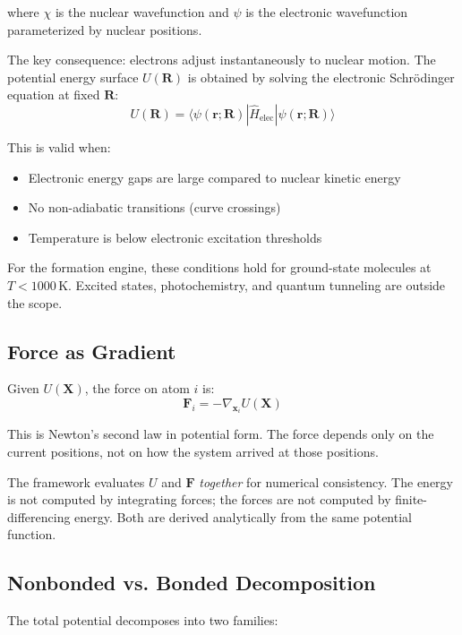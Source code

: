 \documentclass[11pt]{article}
\begin{document}
where $\chi$ is the nuclear wavefunction and $\psi$ is the electronic wavefunction parameterized by nuclear positions.

The key consequence: electrons adjust instantaneously to nuclear motion. The potential energy surface $U(\mathbf{R})$ is obtained by solving the electronic Schrödinger equation at fixed $\mathbf{R}$:
\begin{equation}
U(\mathbf{R}) = \langle \psi(\mathbf{r}; \mathbf{R}) | \hat{H}_{\text{elec}} | \psi(\mathbf{r}; \mathbf{R}) \rangle
\end{equation}

This is valid when:
\begin{itemize}
\item Electronic energy gaps are large compared to nuclear kinetic energy
\item No non-adiabatic transitions (curve crossings)
\item Temperature is below electronic excitation thresholds
\end{itemize}

For the formation engine, these conditions hold for ground-state molecules at $T < 1000$\,K. Excited states, photochemistry, and quantum tunneling are outside the scope.

\subsection{Force as Gradient}

Given $U(\mathbf{X})$, the force on atom $i$ is:
\begin{equation}
\mathbf{F}_i = -\nabla_{\mathbf{x}_i} U(\mathbf{X})
\end{equation}

This is Newton's second law in potential form. The force depends only on the current positions, not on how the system arrived at those positions.

The framework evaluates $U$ and $\mathbf{F}$ \textit{together} for numerical consistency. The energy is not computed by integrating forces; the forces are not computed by finite-differencing energy. Both are derived analytically from the same potential function.

\subsection{Nonbonded vs. Bonded Decomposition}

The total potential decomposes into two families:
\end{document}
